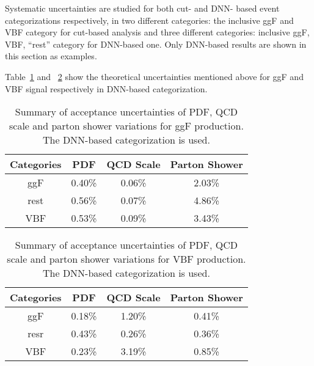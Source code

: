 Systematic uncertainties are studied for both cut- and DNN- based event categorizations respectively, 
in two different categories: the inclusive ggF and VBF category for cut-based analysis and three different categories: inclusive ggF, VBF, ``rest'' category for DNN-based one.
Only DNN-based results are shown in this section as examples.

Table~\ref{tab:acc-ggF-dnn} and ~\ref{tab:acc-VBF-dnn} show the theoretical uncertainties mentioned above for ggF and VBF signal respectively in DNN-based categorization.

\begin{table}[htbp]
  \centering
  \caption{Summary of acceptance uncertainties of PDF, QCD scale and parton shower variations for ggF production. The DNN-based categorization is used.}
  \label{tab:acc-ggF-dnn}
  \begin{spacing}{0.75}
  \begin{tabular}{cccc}
    \toprule
    Categories  & PDF    & QCD Scale  & Parton Shower \\
    \midrule
    ggF  & 0.40\% & 0.06\% & 2.03\% \\
    rest & 0.56\% & 0.07\% & 4.86\% \\
    VBF  & 0.53\% & 0.09\% & 3.43\% \\
    \bottomrule
  \end{tabular}
  \end{spacing}
\end{table}

\begin{table}[htbp]
  \centering
  \caption{Summary of acceptance uncertainties of PDF, QCD scale and parton shower variations for VBF production. The DNN-based categorization is used.}
  \label{tab:acc-VBF-dnn}
  \begin{spacing}{0.75}
  \begin{tabular}{cccc}
    \toprule
    Categories  & PDF    & QCD Scale  & Parton Shower \\
    \midrule
    ggF  & 0.18\% & 1.20\% & 0.41\% \\
    resr & 0.43\% & 0.26\% & 0.36\% \\
    VBF  & 0.23\% & 3.19\% & 0.85\% \\
    \bottomrule
  \end{tabular}
  \end{spacing}
\end{table}

